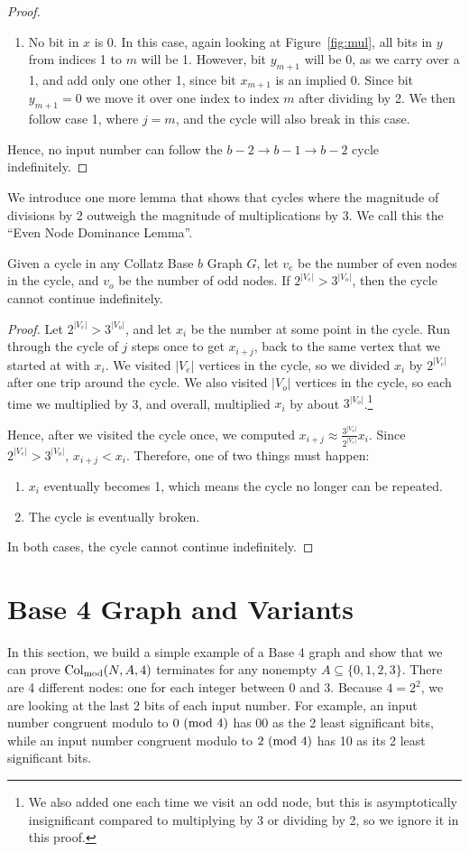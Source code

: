 \begin{proof}
\begin{enumerate}
    \item No bit in $x$ is 0. In this case, again looking at Figure~\ref{fig:mul}, all bits in $y$ from indices 1 to $m$ will be 1. However, bit $y_{m+1}$ will be 0, as we carry over a 1, and add only one other 1, since bit $x_{m+1}$ is an implied 0. Since bit $y_{m+1} = 0$ we move it over one index to index $m$ after dividing by 2. We then follow case 1, where $j = m$, and the cycle will also break in this case.
 \end{enumerate}
 Hence, no input number can follow the $b-2 \rightarrow b-1 \rightarrow b-2$ cycle indefinitely. 
\end{proof}
We introduce one more lemma that shows that cycles where the magnitude of divisions by 2 outweigh the magnitude of multiplications by 3. We call this the ``Even Node Dominance Lemma''.
\begin{lemma}
\label{lem:EvenDom}
Given a cycle in any Collatz Base $b$ Graph $G$, let $v_{e}$ be the number of even nodes in the cycle, and $v_{o}$ be the number of odd nodes. If $2^{|V_e|} > 3^{|V_o|}$, then the cycle cannot continue indefinitely.
\end{lemma}
\begin{proof}
Let $2^{|V_e|} > 3^{|V_o|}$, and let $x_i$ be the number at some point in the cycle. Run through the cycle of $j$ steps once to get $x_{i+j}$, back to the same vertex that we started at with $x_i$. We visited $|V_e|$ vertices in the cycle, so we divided $x_i$ by $2^{|V_e|}$ after one trip around the cycle. We also visited $|V_o|$ vertices in the cycle, so each time we multiplied by 3, and overall, multiplied $x_i$ by about $3^{|V_o|}$.\footnote{We also added one each time we visit an odd node, but this is asymptotically insignificant compared to multiplying by 3 or dividing by 2, so we ignore it in this proof.}\par
Hence, after we visited the cycle once, we computed $x_{i+j} \approx \frac{3^{|V_o|}}{2^{|V_e|}}x_i$. Since $2^{|V_e|} > 3^{|V_o|}$, $x_{i+j} < x_i$. Therefore, one of two things must happen:
\begin{enumerate}
\item $x_i$ eventually becomes 1, which means the cycle no longer can be repeated.
\item The cycle is eventually broken.
\end{enumerate}
In both cases, the cycle cannot continue indefinitely.
\end{proof}
\section{Base 4 Graph and Variants} \label{subsec:base4graph}
In this section, we build a simple example of a Base 4 graph and show that we can prove $\mathrm{Col}_{\text{mod}}(N,A,4)$ terminates for any nonempty $A \subseteq \{0,1,2,3\}$. There are 4 different nodes: one for each integer between 0 and 3. Because $4 = 2^2$, we are looking at the last 2 bits of each input number. For example, an input number congruent modulo to $0\ (\mathrm{mod}\ 4)$ has 00 as the 2 least significant bits, while an input number congruent modulo to $2\ (\mathrm{mod}\ 4)$ has 10 as its 2 least significant bits. 
